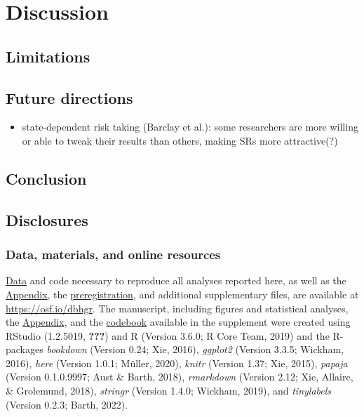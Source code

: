 \documentclass[british,,man,floatsintext]{apa6}
\providecommand{\tightlist}{%
  \setlength{\itemsep}{0pt}\setlength{\parskip}{0pt}}
\begin{document}
\hypertarget{discussion}{%
\section{Discussion}\label{discussion}}

\hypertarget{limitations}{%
\subsection{Limitations}\label{limitations}}

\hypertarget{future-directions}{%
\subsection{Future directions}\label{future-directions}}

\begin{itemize}
\tightlist
\item
  state-dependent risk taking (Barclay et al.): some researchers are more willing or able to tweak their results than others, making SRs more attractive(?)
\end{itemize}

\hypertarget{conclusion}{%
\subsection{Conclusion}\label{conclusion}}

\hypertarget{disclosures}{%
\subsection{Disclosures}\label{disclosures}}

\hypertarget{data-materials-and-online-resources}{%
\subsubsection{Data, materials, and online resources}\label{data-materials-and-online-resources}}

\href{https://osf.io/aqr2s/}{Data} and code necessary to reproduce all analyses reported here, as well as the \href{https://osf.io/qw798/}{Appendix}, the \href{https://osf.io/sy927/}{preregistration}, and additional supplementary files, are available at \url{https://osf.io/dbhgr}.
The manuscript, including figures and statistical analyses, the \href{https://osf.io/qw798/}{Appendix}, and the \href{https://osf.io/6jrkz/}{codebook} available in the supplement were created using RStudio (1.2.5019, {\textbf{???}}) and R (Version 3.6.0; R Core Team, 2019) and the R-packages \emph{bookdown} (Version 0.24; Xie, 2016), \emph{ggplot2} (Version 3.3.5; Wickham, 2016), \emph{here} (Version 1.0.1; Müller, 2020), \emph{knitr} (Version 1.37; Xie, 2015), \emph{papaja} (Version 0.1.0.9997; Aust \& Barth, 2018), \emph{rmarkdown} (Version 2.12; Xie, Allaire, \& Grolemund, 2018), \emph{stringr} (Version 1.4.0; Wickham, 2019), and \emph{tinylabels} (Version 0.2.3; Barth, 2022).
\end{document}
